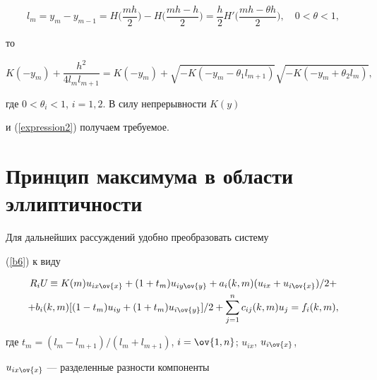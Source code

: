 \begin{pf}
$$


l_m = y_m - y_{m-1} = H \bigg(\frac{mh}{2} \bigg) -


H \bigg(\frac{mh - h}{2} \bigg) = \frac{h}{2} H' \bigg(


\frac{mh - \theta h}{2} \bigg),\quad 0<\theta<1,


$$


то


\begin{equation}\label{expression2}


K(-y_m) + \frac{h^2} {4l_m l_{m+1}} = K(-y_m) +


\sqrt {-K(-y_m - \theta_1l_{m+1})}\sqrt {-K(-y_m + \theta_2l_{m})},


\end{equation}


где $0<\theta_i<1$, $i=1,2$. В силу непрерывности $K(y)$


 и (\ref{expression2}) получаем требуемое.


\end{pf}








\section{Принцип максимума в области эллиптичности}








Для дальнейших рассуждений удобно преобразовать систему


(\ref{b6}) к виду


\begin{multline*}




R_iU_{}\equiv K(m)u_{ix\ov{x}}+(1+t_{m})


u_{iy\ov{y}}+a_i(k,m) (u_{ix}+u_{i\ov{x}})/2+\\


+b_i(k,m)[(1-t_{m})u_{iy}+(1+t_{m})u_{i\ov{y}}]/2+


\sum_{j=1}^{n} c_{ij}(k,m)u_{j}=f_i(k,m),


\end{multline*}


где $t_{m}=(l_m-l_{m+1})/(l_m +l_{m+1})$, $i=\ov


{1,n}$; $u_{ix}$, $u_{i\ov{x}}$,


$u_{ix\ov{x}}$ --- разделенные разности компоненты



